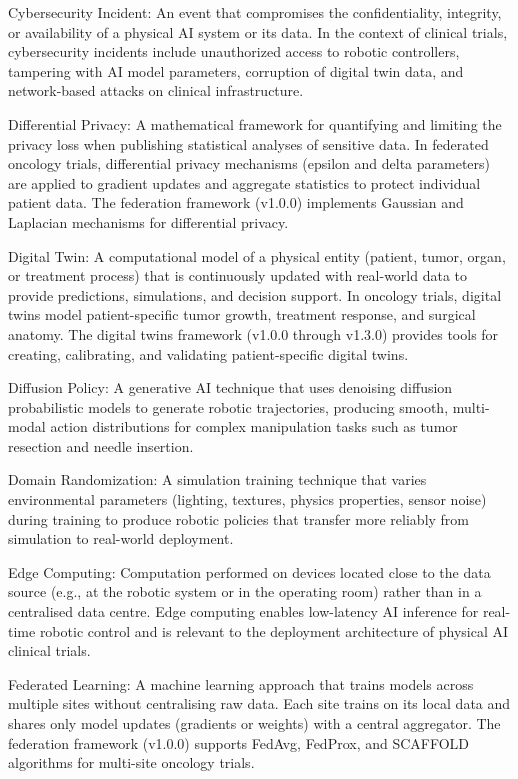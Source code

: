 \documentclass[11pt]{article}
\begin{document}
Cybersecurity Incident: An event that compromises the confidentiality, integrity, or availability of a physical AI system or its data. In the context of clinical trials, cybersecurity incidents include unauthorized access to robotic controllers, tampering with AI model parameters, corruption of digital twin data, and network-based attacks on clinical infrastructure.

Differential Privacy: A mathematical framework for quantifying and limiting the privacy loss when publishing statistical analyses of sensitive data. In federated oncology trials, differential privacy mechanisms (epsilon and delta parameters) are applied to gradient updates and aggregate statistics to protect individual patient data. The federation framework (v1.0.0) implements Gaussian and Laplacian mechanisms for differential privacy.

Digital Twin: A computational model of a physical entity (patient, tumor, organ, or treatment process) that is continuously updated with real-world data to provide predictions, simulations, and decision support. In oncology trials, digital twins model patient-specific tumor growth, treatment response, and surgical anatomy. The digital twins framework (v1.0.0 through v1.3.0) provides tools for creating, calibrating, and validating patient-specific digital twins.

Diffusion Policy: A generative AI technique that uses denoising diffusion probabilistic models to generate robotic trajectories, producing smooth, multi-modal action distributions for complex manipulation tasks such as tumor resection and needle insertion.

Domain Randomization: A simulation training technique that varies environmental parameters (lighting, textures, physics properties, sensor noise) during training to produce robotic policies that transfer more reliably from simulation to real-world deployment.

Edge Computing: Computation performed on devices located close to the data source (e.g., at the robotic system or in the operating room) rather than in a centralised data centre. Edge computing enables low-latency AI inference for real-time robotic control and is relevant to the deployment architecture of physical AI clinical trials.

Federated Learning: A machine learning approach that trains models across multiple sites without centralising raw data. Each site trains on its local data and shares only model updates (gradients or weights) with a central aggregator. The federation framework (v1.0.0) supports FedAvg, FedProx, and SCAFFOLD algorithms for multi-site oncology trials.
\end{document}
